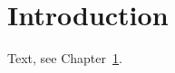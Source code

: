 \documentclass[12pt, a4paper, oneside]{memoir}
\begin{document}
\frontmatter
\tableofcontents*
\mainmatter
\chapter{Introduction}\label{ch:intro}
Text, see Chapter~\ref{ch:intro}.
\backmatter
\end{document}

